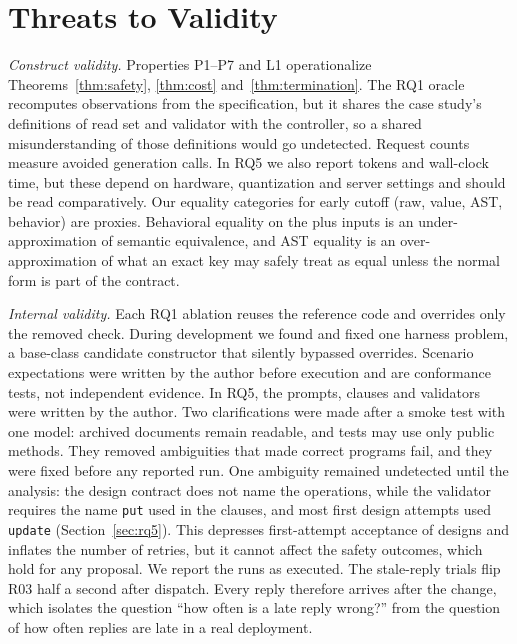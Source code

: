 \section{Threats to Validity}\label{sec:threats}
\emph{Construct validity.} Properties P1--P7 and L1 operationalize Theorems~\ref{thm:safety}, \ref{thm:cost} and~\ref{thm:termination}. The RQ1 oracle recomputes observations from the specification, but it shares the case study's definitions of read set and validator with the controller, so a shared misunderstanding of those definitions would go undetected. Request counts measure avoided generation calls. In RQ5 we also report tokens and wall-clock time, but these depend on hardware, quantization and server settings and should be read comparatively. Our equality categories for early cutoff (raw, value, AST, behavior) are proxies. Behavioral equality on the plus inputs is an under-approximation of semantic equivalence, and AST equality is an over-approximation of what an exact key may safely treat as equal unless the normal form is part of the contract.

\emph{Internal validity.} Each RQ1 ablation reuses the reference code and overrides only the removed check. During development we found and fixed one harness problem, a base-class candidate constructor that silently bypassed overrides. Scenario expectations were written by the author before execution and are conformance tests, not independent evidence. In RQ5, the prompts, clauses and validators were written by the author. Two clarifications were made after a smoke test with one model: archived documents remain readable, and tests may use only public methods. They removed ambiguities that made correct programs fail, and they were fixed before any reported run. One ambiguity remained undetected until the analysis: the design contract does not name the operations, while the validator requires the name \texttt{put} used in the clauses, and most first design attempts used \texttt{update} (Section~\ref{sec:rq5}). This depresses first-attempt acceptance of designs and inflates the number of retries, but it cannot affect the safety outcomes, which hold for any proposal. We report the runs as executed. The stale-reply trials flip R03 half a second after dispatch. Every reply therefore arrives after the change, which isolates the question ``how often is a late reply wrong?'' from the question of how often replies are late in a real deployment.


